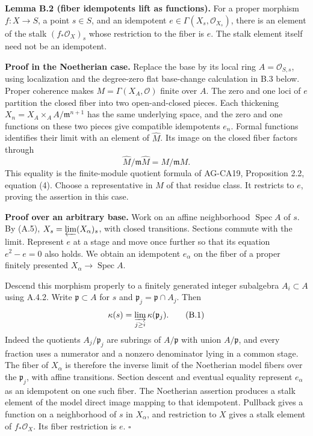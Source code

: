 \documentclass[11pt]{article}
\begin{document}
\textbf{Lemma B.2 (fiber idempotents lift as functions).} For a proper
morphism \(f:X\to S\), a point \(s\in S\), and an idempotent
\(e\in\Gamma(X_s,\mathcal O_{X_s})\), there is an element of the stalk
\((f_*\mathcal O_X)_s\) whose restriction to the fiber is \(e\). The
stalk element itself need not be an idempotent.

\textbf{Proof in the Noetherian case.} Replace the base by its local
ring \(A=\mathcal O_{S,s}\), using localization and the degree-zero flat
base-change calculation in B.3 below. Proper coherence makes
\(M=\Gamma(X_A,\mathcal O)\) finite over \(A\). The zero and one loci of
\(e\) partition the closed fiber into two open-and-closed pieces. Each
thickening \(X_n=X_A\times_A A/\mathfrak m^{n+1}\) has the same
underlying space, and the zero and one functions on these two pieces
give compatible idempotents \(e_n\). Formal functions identifies their
limit with an element of \(\widehat M\). Its image on the closed fiber
factors through \[
\widehat M/\mathfrak m\widehat M=M/\mathfrak mM.
\] This equality is the finite-module quotient formula of AG-CA19,
Proposition 2.2, equation (4). Choose a representative in \(M\) of that
residue class. It restricts to \(e\), proving the assertion in this
case.

\textbf{Proof over an arbitrary base.} Work on an affine neighborhood
\(\operatorname{Spec}A\) of \(s\). By (A.5),
\(X_s=\varprojlim (X_\alpha)_s\), with closed transitions. Sections
commute with the limit. Represent \(e\) at a stage and move once further
so that its equation \(e^2-e=0\) also holds. We obtain an idempotent
\(e_\alpha\) on the fiber of a proper finitely presented
\(X_\alpha\to\operatorname{Spec}A\).

Descend this morphism properly to a finitely generated integer
subalgebra \(A_i\subset A\) using A.4.2. Write \(\mathfrak p\subset A\)
for \(s\) and \(\mathfrak p_j=\mathfrak p\cap A_j\). Then \[
\kappa(s)=\varinjlim_{j\ge i}\kappa(\mathfrak p_j).
\tag{B.1}
\] Indeed the quotients \(A_j/\mathfrak p_j\) are subrings of
\(A/\mathfrak p\) with union \(A/\mathfrak p\), and every fraction uses
a numerator and a nonzero denominator lying in a common stage. The fiber
of \(X_\alpha\) is therefore the inverse limit of the Noetherian model
fibers over the \(\mathfrak p_j\), with affine transitions. Section
descent and eventual equality represent \(e_\alpha\) as an idempotent on
one such fiber. The Noetherian assertion produces a stalk element of the
model direct image mapping to that idempotent. Pullback gives a function
on a neighborhood of \(s\) in \(X_\alpha\), and restriction to \(X\)
gives a stalk element of \(f_*\mathcal O_X\). Its fiber restriction is
\(e\). \(\square\)
\end{document}
